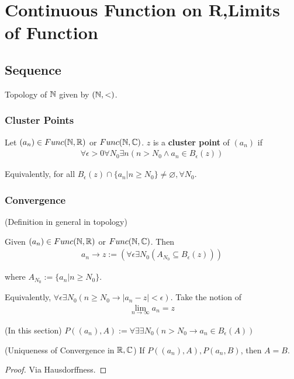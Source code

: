 \documentclass[Total.tex]{subfiles}
\begin{document}
	
	\chapter{Continuous Function on $\mathbf{R}$,Limits of Function}
		
	
		\section{Sequence}
			
			Topology of $\mathbb{N}$ given by $(\mathbb{N},<)$.
			\subsection{Cluster Points}
			
			\begin{Def}
				Let $(a_n)\in Func(\mathbb{N},\mathbb{R})$ or $Func(\mathbb{N},\mathbb{C})$. $z$ is a \textbf{cluster point} of $(a_n)$ if 
				\begin{gather*}
					\forall \epsilon>0 \forall N_0\exists n(n>N_0\wedge a_n\in B_\epsilon(z))
				\end{gather*}
			\end{Def}
			
			Equivalently, for all $B_\epsilon(z)\cap \{a_n|n\geq N_0\}\not=\varnothing,\forall N_0$. 
			
			\subsection{Convergence}
			(Definition in general in topology)
			\begin{Def}
				Given $(a_n)\in Func(\mathbb{N},\mathbb{R})$ or $Func(\mathbb{N},\mathbb{C})$. Then 
				\begin{gather*}
					a_n\rightarrow z:=(\forall \epsilon\exists N_0(A_{N_0}\subseteq B_\epsilon(z)))
				\end{gather*}
				
				where $A_{N_0}:=\{a_n|n\geq N_0\}$.
			\end{Def}
			
			Equivalently, $\forall \epsilon\exists N_0(n\geq N_0\rightarrow |a_n-z|<\epsilon)$. Take the notion of
			\begin{gather*}
				\lim_{n\rightarrow \infty} a_n=z
			\end{gather*}
			
			(In this section) $P((a_n),A):=\forall\exists \exists N_0(n>N_0\rightarrow a_n\in B_\epsilon(A))$
			
			\begin{lemma}
				(Uniqueness of Convergence in $\mathbb{R},\mathbb{C}$) If $P((a_n),A),P(a_n,B)$, then $A=B$.
			\end{lemma}
			\begin{proof}
				Via Hausdorffness.
			\end{proof}
			
\end{document}
